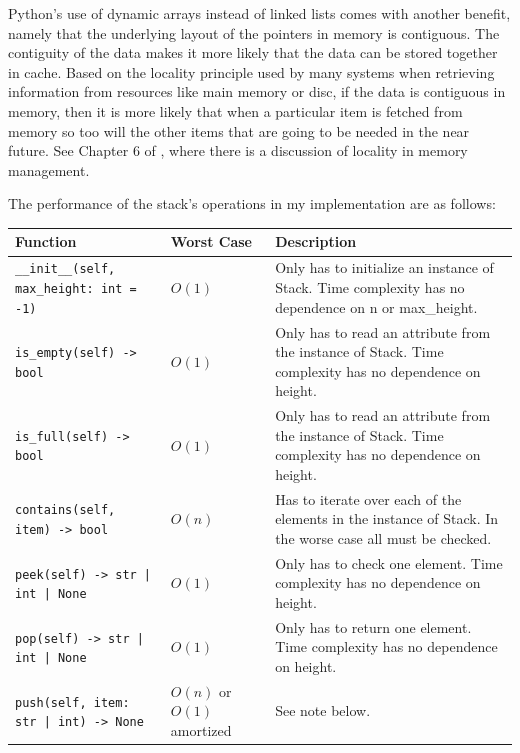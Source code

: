 \documentclass[10pt,letterpaper,final]{report}
\begin{document}
Python's use of dynamic arrays instead of linked lists comes with another benefit, namely that the underlying layout of the pointers in memory is contiguous. The contiguity of the data makes it more likely that the data can be stored together in cache. Based on the locality principle used by many systems when retrieving information from resources like main memory or disc, if the data is contiguous in memory, then it is more likely that when a particular item is fetched from memory so too will the other items that are going to be needed in the near future. See Chapter 6 of \textcite{null2023essentials}, where there is a discussion of locality in memory management.

The performance of the stack's operations in my implementation are as follows:

\begin{center}
  \begin{tabularx}{\textwidth}{|l|l|X|}
    \hline
    Function                                      & Worst Case                 & Description                                                                                               \\ \hline
    \texttt{__init__(self, max_height: int = -1)} & $O(1)$                     & Only has to initialize an instance of Stack. Time complexity has no dependence on n or max_height.        \\ \hline
    \texttt{is_empty(self) -> bool}               & $O(1)$                     & Only has to read an attribute from the instance of Stack. Time complexity has no dependence on height.    \\ \hline
    \texttt{is_full(self) -> bool}                & $O(1)$                     & Only has to read an attribute from the instance of Stack. Time complexity has no dependence on height.    \\ \hline
    \texttt{contains(self, item) -> bool}         & $O(n)$                     & Has to iterate over each of the elements in the instance of Stack. In the worse case all must be checked. \\ \hline
    \texttt{peek(self) -> str | int | None}       & $O(1)$                     & Only has to check one element. Time complexity has no dependence on height.                               \\ \hline
    \texttt{pop(self) -> str | int | None}        & $O(1)$                     & Only has to return one element. Time complexity has no dependence on height.                              \\ \hline
    \texttt{push(self, item: str | int) -> None}  & $O(n)$ or $O(1)$ amortized & See note below.                                                                                           \\ \hline
  \end{tabularx}
\end{center}
\end{document}
